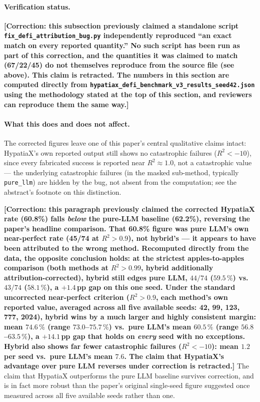 \documentclass[twoside,11pt]{article}
\newcommand{\Rsq}{R^{2}}
\begin{document}
\paragraph{Verification status.}
\textbf{[Correction: this subsection previously claimed a standalone
script \texttt{fix\_defi\_attribution\_bug.py} independently reproduced
``an exact match on every reported quantity.'' No such script has been
run as part of this correction, and the quantities it was claimed to
match (67/22/45) do not themselves reproduce from the source file (see
above). This claim is retracted. The numbers in this section are
computed directly from
\texttt{hypatiax\_defi\_benchmark\_v3\_results\_seed42.json} using the
methodology stated at the top of this section, and reviewers can
reproduce them the same way.]}

\paragraph{What this does and does not affect.} The corrected figures leave
one of this paper's central qualitative claims intact: HypatiaX's own
reported output still shows no catastrophic failures ($\Rsq < -10$), since
every fabricated success is reported near $\Rsq \approx 1.0$, not a
catastrophic value --- the underlying catastrophic failures (in the masked
sub-method, typically \texttt{pure\_llm}) are hidden by the bug, not absent
from the computation; see the abstract's footnote on this distinction.

\textbf{[Correction: this paragraph previously claimed the corrected
HypatiaX rate (60.8\%) falls \emph{below} the pure-LLM baseline
(62.2\%), reversing the paper's headline comparison. That 60.8\% figure
was pure LLM's own near-perfect rate (45/74 at $\Rsq>0.9$), not
hybrid's --- it appears to have been attributed to the wrong method.
Recomputed directly from the data, the opposite conclusion holds: at
the strictest apples-to-apples comparison (both methods at
$\Rsq>0.99$, hybrid additionally attribution-corrected), hybrid still
edges pure LLM, $44/74$ ($59.5\,\%$) vs.\ $43/74$ ($58.1\,\%$), a
$+1.4$\,pp gap on this one seed. Under the standard uncorrected
near-perfect criterion ($\Rsq>0.9$, each method's own reported value,
averaged across all five available seeds: 42, 99, 123, 777, 2024),
hybrid wins by a much larger and highly consistent margin: mean
$74.6\,\%$ (range $73.0$--$75.7\,\%$) vs.\ pure LLM's mean $60.5\,\%$
(range $56.8$--$63.5\,\%$), a $+14.1$\,pp gap that holds on
\emph{every} seed with no exceptions. Hybrid also shows far fewer
catastrophic failures ($\Rsq<-10$): mean $1.2$ per seed vs.\ pure LLM's
mean $7.6$. The claim that HypatiaX's advantage over pure LLM reverses
under correction is retracted.]}
The claim that HypatiaX outperforms the pure LLM baseline
survives correction, and is in fact more robust than the paper's
original single-seed figure suggested once measured across all five
available seeds rather than one.
\end{document}
